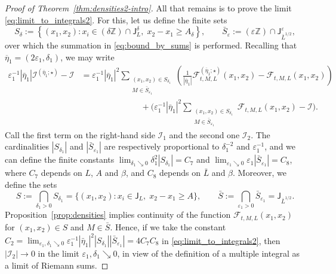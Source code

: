 \documentclass[oneside,final,11pt]{amsart}
\theoremstyle{definition}
\newcommand{\bJ}{\mathsf{J}}
\newcommand{\zz}{\mathbb{Z}}
\newcommand{\dens}{\CF}
\newcommand{\1}[1]{\mathbf{1}_{#1}}
\newcommand{\eps}{\varepsilon}
\newcommand{\CI}{\mathcal{I}}
\newcommand{\CF}{\mathcal{F}}
\numberwithin{equation}{section}
\begin{document}
\begin{proof}[Proof of Theorem~\ref{thm:densities2-intro}]
All that remains is to prove the limit \eqref{eq:limit_to_integrals2}. For this, let us define the finite sets
\begin{equation}
S_\delta := \left\{(x_1, x_2) : x_i \in (\delta \zz) \cap \bJ_{ L}^{\delta},\; x_2 - x_1 \geq A_\delta\right\}, \qquad \bar S_\eps := (\eps \zz) \cap \bJ_{\bar L^{1/2}}^{\eps},
\end{equation}
 over which the summation in \eqref{eq:bound_by_sums} is performed. Recalling that $\overline \eta_1 = (2 \eps_1, \delta_1)$, we may write
\begin{align}
\eps_1^{-1} |\bar \eta_1| \CI^{(\bar \eta_1; \star)} - \CI &= \eps_1^{-1} |\bar \eta_1|^2 \sum_{\substack{(x_1, x_2) \in S_{\delta_1} \\ M \in \bar S_{\eps_1}}} \left( \frac{1}{|\overline \eta_1|} \dens^{(\overline\eta_1; \star)}_{t, M, L}(x_1, x_2) - \dens_{t, M, L}(x_1, x_2) \right)\\
&\hspace{3cm} + \biggl( \eps_1^{-1} |\bar \eta_1|^2 \sum_{\substack{(x_1, x_2) \in S_{\delta_1} \\ M \in \bar S_{\eps_1}}} \dens_{t, M, L}(x_1, x_2) - \CI \biggr).\label{eq:limit_to_integrals_proof}
\end{align}
Call the first term on the right-hand side $\CI_1$ and the second one $\CI_2$.
The cardinalities $|S_{\delta_1}|$ and $|\bar S_{\eps_1}|$ are respectively proportional to $\delta_1^{-2}$ and $\eps_1^{-1}$, and we can define the finite constants $\lim_{\delta_1 \searrow 0} \delta_1^2 |S_{\delta_1}| = C_7$ and $\lim_{\eps_1 \searrow 0} \eps_1 |\bar{S}_{\eps_1}| = C_8$, where $C_7$ depends on $L$, $A$ and $\beta$, and $C_8$ depends on $\bar L$ and $\beta$. Moreover, we define the sets
\begin{equation}
S := \bigcap_{\delta_1 > 0} S_{\delta_1} = \bigl\{(x_1, x_2) : x_i \in \bJ_{L},\; x_2 - x_1 \geq A\bigr\}, \qquad \bar S := \bigcap_{\eps_1 > 0} \bar{S}_{\eps_1} = \bJ_{\bar L^{1/2}}.
\end{equation}
Proposition~\ref{prop:densities} implies continuity of the function $\dens_{t, M, L}(x_1, x_2)$ for $(x_1, x_2) \in S$ and $M \in \bar S$. Hence, if we take the constant $C_2 = \lim_{\eps_1, \delta_1 \searrow 0} \eps_1^{-1} |\bar \eta_1|^2 |S_{\delta_1}| |\bar{S}_{\eps_1}| = 4 C_7 C_8$ in \eqref{eq:limit_to_integrals2}, then $|\CI_2|\to 0$ in the limit $\eps_1, \delta_1 \searrow 0$, in view of the definition of a multiple integral as a limit of Riemann sums.


\end{proof}
\end{document}
